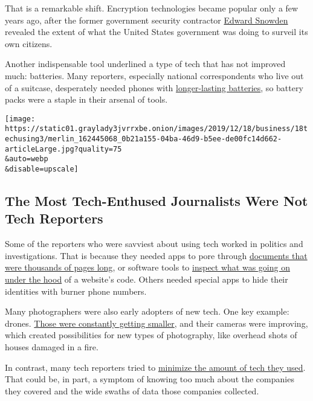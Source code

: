 That is a remarkable shift. Encryption technologies became popular only
a few years ago, after the former government security contractor
\href{https://www.nytimes3xbfgragh.onion/2019/09/13/books/review-permanent-record-edward-snowden-memoir.html}{Edward
Snowden} revealed the extent of what the United States government was
doing to surveil its own citizens.

Another indispensable tool underlined a type of tech that has not
improved much: batteries. Many reporters, especially national
correspondents who live out of a suitcase, desperately needed phones
with
\href{https://www.nytimes3xbfgragh.onion/2018/03/28/technology/personaltech/tech-tools-shootings-hurricanes.html}{longer-lasting
batteries}, so battery packs were a staple in their arsenal of tools.

\texttt{[image: https://static01.graylady3jvrrxbe.onion/images/2019/12/18/business/18techusing3/merlin\_162445068\_0b21a155-04ba-46d9-b5ee-de00fc14d662-articleLarge.jpg?quality=75\\\&auto=webp\\\&disable=upscale]}

\hypertarget{the-most-tech-enthused-journalists-were-not-tech-reporters}{%
\subsection{The Most Tech-Enthused Journalists Were Not Tech
Reporters}\label{the-most-tech-enthused-journalists-were-not-tech-reporters}}

Some of the reporters who were savviest about using tech worked in
politics and investigations. That is because they needed apps to pore
through
\href{https://www.nytimes3xbfgragh.onion/2018/07/18/technology/personaltech/tech-reporter-does-not-use-tech.html}{documents
that were thousands of pages long}, or software tools to
\href{https://www.nytimes3xbfgragh.onion/2019/05/22/technology/personaltech/maximize-online-privacy.html}{inspect
what was going on under the hood} of a website's code. Others needed
special apps to hide their identities with burner phone numbers.

Many photographers were also early adopters of new tech. One key
example: drones.
\href{https://www.nytimes3xbfgragh.onion/2018/05/02/technology/personaltech/visual-journalism-drones.html}{Those
were constantly getting smaller}, and their cameras were improving,
which created possibilities for new types of photography, like overhead
shots of houses damaged in a fire.

In contrast, many tech reporters tried to
\href{https://www.nytimes3xbfgragh.onion/2018/07/18/technology/personaltech/tech-reporter-does-not-use-tech.html}{minimize
the amount of tech they used}. That could be, in part, a symptom of
knowing too much about the companies they covered and the wide swaths of
data those companies collected.

